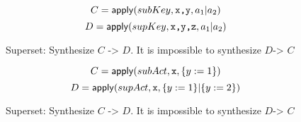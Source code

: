 \begin{figure}
  \[C = \mathsf{apply}(subKey, \texttt{x,y}, a_1 | a_2 )\]
  \[D = \mathsf{apply}(supKey, \texttt{x,y,z}, a_1 | a_2 )\]
  \caption{Superset: Synthesize $C$ -> $D$. It is impossible to synthesize $D$-> $C$}
\end{figure}


\begin{figure}
  \[C = \mathsf{apply}(subAct, \texttt{x}, \{y:=1\} )\]
  \[D = \mathsf{apply}(supAct, \texttt{x}, \{y:=1\}| \{y:=2\})\]
  \caption{Superset: Synthesize $C$ -> $D$. It is impossible to synthesize $D$-> $C$}
\end{figure}